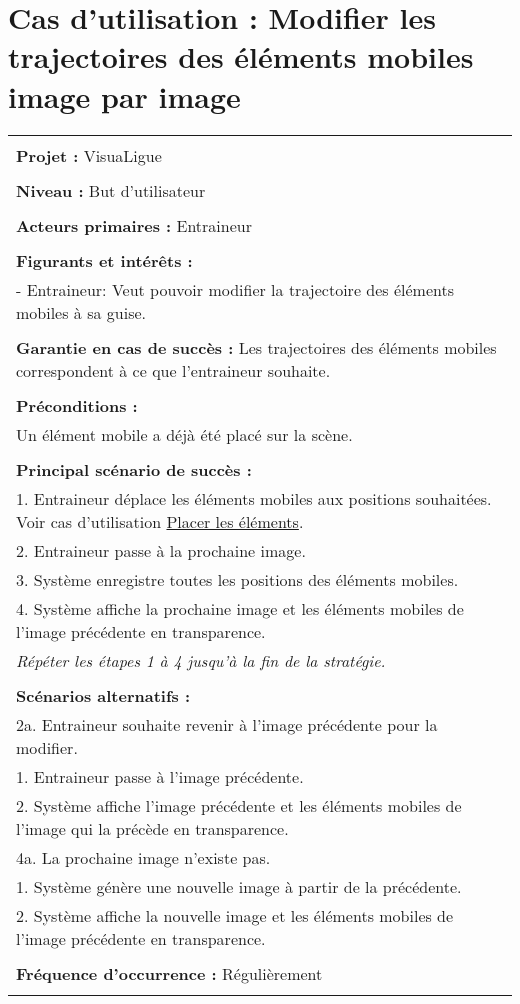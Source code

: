 \section{Cas d'utilisation : Modifier les trajectoires des éléments mobiles image par image}
\begin{longtable}{|p{16cm}|}
	\hline
	\\
	\textbf{Projet :} VisuaLigue\\
	\\
	\textbf{Niveau :} But d'utilisateur\\
	\\
	\textbf{Acteurs primaires :} Entraineur\\
	\\
	\textbf{Figurants et intérêts :} \\
	- Entraineur: Veut pouvoir modifier la trajectoire des éléments mobiles à sa guise.\\
	\\
	\textbf{Garantie en cas de succès :} Les trajectoires des éléments mobiles correspondent à ce que l'entraineur souhaite.\\
	\\
	\textbf{Préconditions :}\\
	Un élément mobile a déjà été placé sur la scène.\\
	\\
	\textbf{Principal scénario de succès :}\\
	1. Entraineur déplace les éléments mobiles aux positions souhaitées. Voir cas d'utilisation \underline{Placer les éléments}.\\
	2. Entraineur passe à la prochaine image.\\
	3. Système enregistre toutes les positions des éléments mobiles.\\
	4. Système affiche la prochaine image et les éléments mobiles de l'image précédente en transparence.\\
	\textit{Répéter les étapes 1 à 4 jusqu'à la fin de la stratégie.}\\
	\\
	\textbf{Scénarios alternatifs :}\\
	2a. Entraineur souhaite revenir à l'image précédente pour la modifier.\\
	\hspace{0.5cm}1. Entraineur passe à l'image précédente.\\
	\hspace{0.5cm}2. Système affiche l'image précédente et les éléments mobiles de l'image qui la précède en transparence.\\
	4a. La prochaine image n'existe pas.\\
	\hspace{0.5cm}1. Système génère une nouvelle image à partir de la précédente.\\
	\hspace{0.5cm}2. Système affiche la nouvelle image et les éléments mobiles de l'image précédente en transparence.\\
	\\
	\textbf{Fréquence d'occurrence :} Régulièrement\\
	\\
	\hline
\end{longtable}

